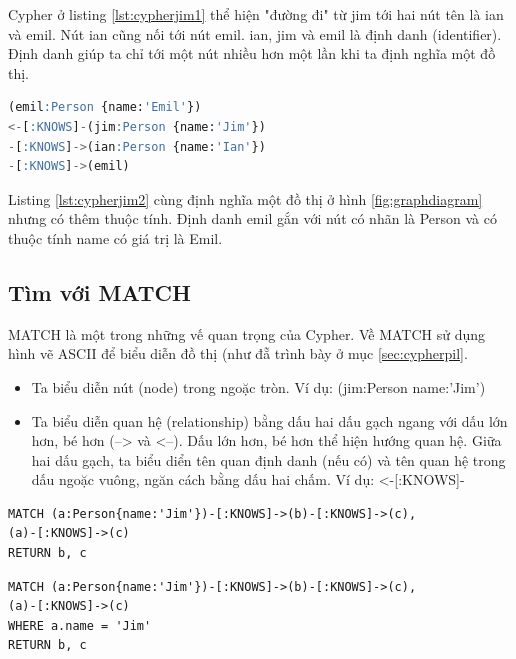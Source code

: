 
Cypher ở listing \ref{lst:cypherjim1} thể hiện "đường đi" từ jim tới hai nút tên là ian và emil. Nút ian cũng nối tới nút emil. ian, jim và emil là định danh (identifier). Định danh giúp ta chỉ tới một nút nhiều hơn một lần khi ta định nghĩa một đồ thị. 

\begin{lstlisting}[caption={Cypher với thuộc tính}, label={lst:cypherjim2}, language=SQL]
(emil:Person {name:'Emil'})
<-[:KNOWS]-(jim:Person {name:'Jim'})
-[:KNOWS]->(ian:Person {name:'Ian'})
-[:KNOWS]->(emil) 
\end{lstlisting}

Listing \ref{lst:cypherjim2} cùng định nghĩa một đồ thị ở hình \ref{fig:graphdiagram} nhưng có thêm thuộc tính. Định danh emil gắn với nút có nhãn là Person và có thuộc tính name có giá trị là Emil. 

\subsection{Tìm với MATCH}

MATCH là một trong những vế quan trọng của Cypher. Về MATCH sử dụng hình vẽ ASCII để biểu diễn đồ thị (như đẵ trình bày ở mục \ref{sec:cypherpil}.

\begin{itemize}
\item Ta biểu diễn nút (node) trong ngoặc tròn. Ví dụ: (jim:Person {name:'Jim'})
\item Ta biểu diễn quan hệ (relationship) bằng dấu hai dấu gạch ngang với dấu lớn hơn, bé hơn (--> và <--). Dấu lớn hơn, bé hơn thể hiện hướng quan hệ. Giữa hai dấu gạch, ta biểu diển tên quan định danh (nếu có) và tên quan hệ trong dấu ngoặc vuông, ngăn cách bằng dấu hai chấm. Ví dụ:  <-[:KNOWS]-
\end{itemize}

\begin{lstlisting}[caption={Cypher query từ người tên Jim}, label={lst:cypherjim3}]
MATCH (a:Person{name:'Jim'})-[:KNOWS]->(b)-[:KNOWS]->(c),
(a)-[:KNOWS]->(c) 
RETURN b, c 
\end{lstlisting}

\begin{lstlisting}[caption={Cypher query từ người tên Jim sử dụng WHERE}, label={lst:cypherjim4}]
MATCH (a:Person{name:'Jim'})-[:KNOWS]->(b)-[:KNOWS]->(c),
(a)-[:KNOWS]->(c) 
WHERE a.name = 'Jim'
RETURN b, c 
\end{lstlisting}

